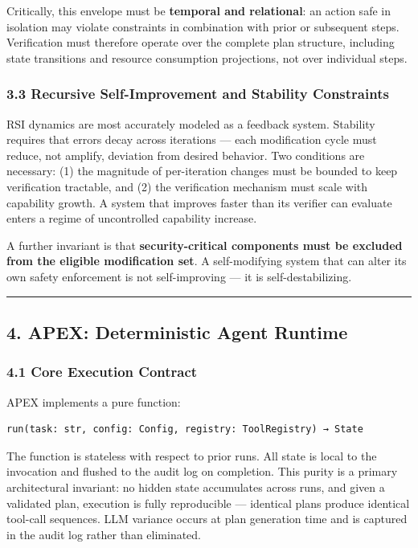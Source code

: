 Critically, this envelope must be \textbf{temporal and relational}: an
action safe in isolation may violate constraints in combination with
prior or subsequent steps. Verification must therefore operate over the
complete plan structure, including state transitions and resource
consumption projections, not over individual steps.

\subsubsection{3.3 Recursive Self-Improvement and Stability
Constraints}\label{recursive-self-improvement-and-stability-constraints}

RSI dynamics are most accurately modeled as a feedback system. Stability
requires that errors decay across iterations --- each modification cycle
must reduce, not amplify, deviation from desired behavior. Two
conditions are necessary: (1) the magnitude of per-iteration changes
must be bounded to keep verification tractable, and (2) the verification
mechanism must scale with capability growth. A system that improves
faster than its verifier can evaluate enters a regime of uncontrolled
capability increase.

A further invariant is that \textbf{security-critical components must be
excluded from the eligible modification set}. A self-modifying system
that can alter its own safety enforcement is not self-improving --- it
is self-destabilizing.

\begin{center}\rule{0.5\linewidth}{0.5pt}\end{center}

\subsection{4. APEX: Deterministic Agent
Runtime}\label{apex-deterministic-agent-runtime}

\subsubsection{4.1 Core Execution
Contract}\label{core-execution-contract}

APEX implements a pure function:

\begin{verbatim}
run(task: str, config: Config, registry: ToolRegistry) → State
\end{verbatim}

The function is stateless with respect to prior runs. All state is local
to the invocation and flushed to the audit log on completion. This
purity is a primary architectural invariant: no hidden state accumulates
across runs, and given a validated plan, execution is fully reproducible
--- identical plans produce identical tool-call sequences. LLM variance
occurs at plan generation time and is captured in the audit log rather
than eliminated.

